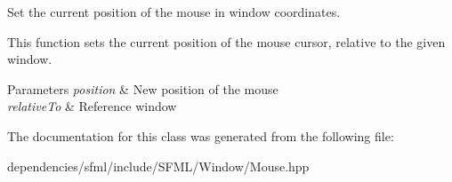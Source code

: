 Set the current position of the mouse in window coordinates. 

This function sets the current position of the mouse cursor, relative to the given window.


\begin{DoxyParams}{Parameters}
{\em position} & New position of the mouse \\
\hline
{\em relative\+To} & Reference window \\
\hline
\end{DoxyParams}


The documentation for this class was generated from the following file\+:\begin{DoxyCompactItemize}
\item 
dependencies/sfml/include/\+S\+F\+M\+L/\+Window/Mouse.\+hpp\end{DoxyCompactItemize}
